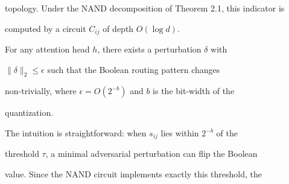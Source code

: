 topology.  Under the NAND decomposition of Theorem 2.1, this indicator is






computed by a circuit $C_{ij}$ of depth $O(\log d)$.













\begin{conjecture}






\label{conj:threshold-sensitivity}






For any attention head $h$, there exists a perturbation $\delta$ with






$\|\delta\|_2 \leq \epsilon$ such that the Boolean routing pattern changes






non-trivially, where $\epsilon = O(2^{-b})$ and $b$ is the bit-width of the






quantization.






\end{conjecture}













The intuition is straightforward: when $s_{ij}$ lies within $2^{-b}$ of the






threshold $\tau$, a minimal adversarial perturbation can flip the Boolean






value.  Since the NAND circuit implements exactly this threshold, the






